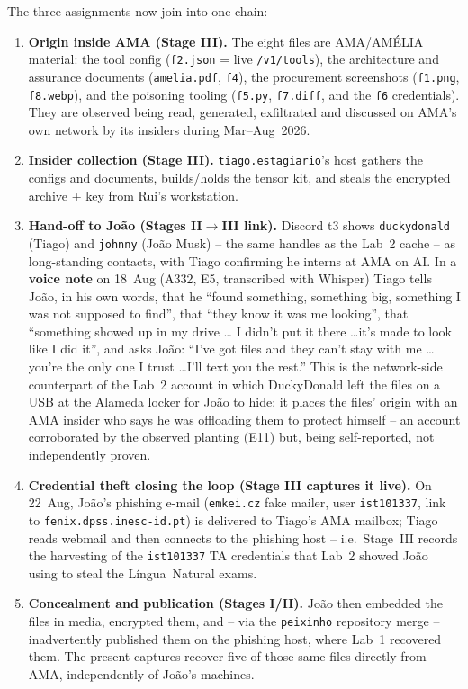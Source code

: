 \documentclass[11pt,a4paper,final,oneside]{article}
\begin{document}
The three assignments now join into one chain:
\begin{enumerate}
  \item \textbf{Origin inside AMA (Stage III).} The eight files are AMA/AMÉLIA
  material: the tool config (\texttt{f2.json} = live \texttt{/v1/tools}), the
  architecture and assurance documents (\texttt{amelia.pdf}, \texttt{f4}), the
  procurement screenshots (\texttt{f1.png}, \texttt{f8.webp}), and the poisoning
  tooling (\texttt{f5.py}, \texttt{f7.diff}, and the \texttt{f6} credentials).
  They are observed being read, generated, exfiltrated and discussed on AMA's own
  network by its insiders during Mar--Aug~2026.
  \item \textbf{Insider collection (Stage III).} \texttt{tiago.estagiario}'s host
  gathers the configs and documents, builds/holds the tensor kit, and steals the
  encrypted archive + key from Rui's workstation.
  \item \textbf{Hand-off to João (Stages II$\rightarrow$III link).} Discord t3
  shows \texttt{duckydonald} (Tiago) and \texttt{johnny} (João Musk) -- the same
  handles as the Lab~2 cache -- as long-standing contacts, with Tiago confirming
  he interns at AMA on AI. In a \textbf{voice note} on 18~Aug (A332, E5,
  transcribed with Whisper) Tiago tells João, in his own words, that he
  ``found something, something big, something I was not supposed to find'', that
  ``they know it was me looking'', that ``something showed up in my drive \ldots
  I didn't put it there \ldots it's made to look like I did it'', and asks João:
  ``I've got files and they can't stay with me \ldots you're the only one I trust
  \ldots I'll text you the rest.'' This is the network-side counterpart of the
  Lab~2 account in which DuckyDonald left the files on a USB at the Alameda locker
  for João to hide: it places the files' origin with an AMA insider who says he was
  offloading them to protect himself -- an account corroborated by the observed
  planting (E11) but, being self-reported, not independently proven.
  \item \textbf{Credential theft closing the loop (Stage III captures it live).}
  On 22~Aug, João's phishing e-mail (\texttt{emkei.cz} fake mailer, user
  \texttt{ist101337}, link to \texttt{fenix.dpss.inesc-id.pt}) is delivered to
  Tiago's AMA mailbox; Tiago reads webmail and then connects to the phishing host
  -- i.e.\ Stage~III records the harvesting of the \texttt{ist101337} TA
  credentials that Lab~2 showed João using to steal the Língua~Natural exams.
  \item \textbf{Concealment and publication (Stages I/II).} João then embedded the
  files in media, encrypted them, and -- via the \texttt{peixinho} repository
  merge -- inadvertently published them on the phishing host, where Lab~1
  recovered them. The present captures recover five of those same files directly
  from AMA, independently of João's machines.
\end{enumerate}
\end{document}
